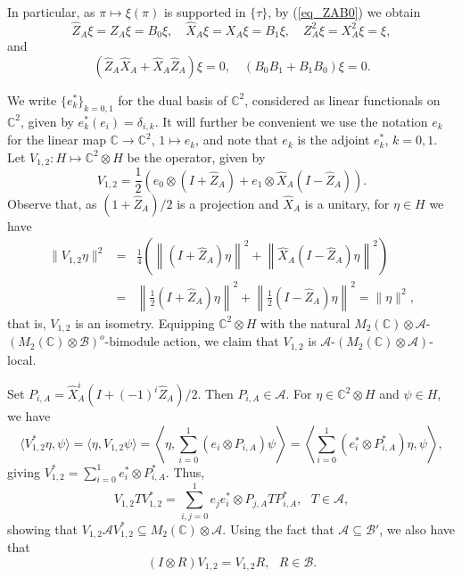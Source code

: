 \documentclass[11pt]{amsart}
\theoremstyle{definition}
\newcommand{\cl}[1]{\mathcal{#1}}
\newcommand{\bb}[1]{\mathbb{#1}}
\begin{document}
In particular, as $\pi\mapsto\xi(\pi)$ is supported in 
$\{\tau\}$, by (\ref{eq_ZAB0}) we obtain
\begin{equation}\label{vectorequ}
\hat Z_A\xi= Z_A\xi=B_0\xi,\quad  \hat X_A\xi= X_A\xi=B_1\xi, \quad Z_A^2\xi=X_A^2\xi=\xi,
\end{equation}
and 
\begin{equation}\label{vectorequ2}
(\hat Z_A\hat X_A+\hat X_A\hat Z_A)\xi=0, \quad (B_0B_1+B_1B_0)\xi=0.
\end{equation}

We write $\{e_k^*\}_{k=0,1}$ for the dual basis of $\bb{C}^2$, 
considered as linear functionals on $\bb{C}^2$, given by $e_k^*(e_i)=\delta_{i,k}$. 
It will further be convenient we use the notation $e_k$ 
for the linear map $\mathbb C\to\mathbb C^2$, $1\mapsto e_k$, 
and note that $e_k$ is the adjoint $e_k^*$, $k = 0,1$. 
Let $V_{1,2} : H\mapsto \mathbb C^2\otimes H$ be the 
operator, given by 
\begin{equation}\label{eq_V_12de}
V_{1,2} = \frac{1}{2}(e_0\otimes (I+\hat Z_A) 
+ e_1\otimes \hat X_A(I-\hat Z_A)).
\end{equation}
Observe that, as $(1+\hat Z_A)/2$ is a projection and $\hat X_A$ is a unitary,  
for $\eta\in H$ we have 
\begin{eqnarray*}
\|V_{1,2}\eta\|^2
& = &
\frac{1}{4}\left(\left\|(I+\hat Z_A)\eta\right\|^2
+ \left\|\hat X_A(I-\hat Z_A)\eta\right\|^2\right)\\
& = &
\left\|\frac{1}{2}(I+\hat Z_A)\eta \right\|^2
+ \left\|\frac{1}{2}(I-\hat Z_A)\eta\right\|^2
=
\|\eta\|^2,
\end{eqnarray*}
that is, $V_{1,2}$ is an isometry.
Equipping  $\mathbb C^2\otimes H$ with the natural
$M_2(\mathbb C)\otimes \cl A$-$(M_2(\mathbb C)\otimes \cl B)^{o}$-bimodule action, we claim that $V_{1,2}$ is 
$\cl A$-$(M_2(\mathbb C)\otimes\cl A)$-local. 

 
Set $P_{i,A} = \hat X_A^i(I + (-1)^i\hat Z_A)/2$. 
Then $P_{i,A}\in\cl A$. For $\eta\in \bb{C}^2\otimes H$ and $\psi\in H$, we have
$$\langle V_{1,2}^*\eta,\psi\rangle
= \langle \eta,V_{1,2}\psi\rangle
= \left\langle \eta,\sum_{i=0}^1(e_i\otimes P_{i,A})\psi\right\rangle
= \left\langle \sum_{i=0}^1(e_i^*\otimes P_{i,A}^*)\eta,\psi\right\rangle,$$
giving $V_{1,2}^*=\sum_{i=0}^1e_i^*\otimes P_{i,A}^*$. 
Thus, 
$$V_{1,2} T V_{1,2}^*=\sum_{i,j=0}^1e_je_i^*\otimes P_{j,A} T P_{i,A}^*, \ \ \ T\in \cl A,$$
showing that 
$V_{1,2}\cl AV_{1,2}^*\subseteq M_2(\mathbb C)\otimes\cl A$.
Using the fact that $\cl A\subseteq\cl B'$, 
we also have that 
$$(I\otimes R)V_{1,2} = V_{1,2}R, \ \ \ R\in \cl B.$$
\end{document}
